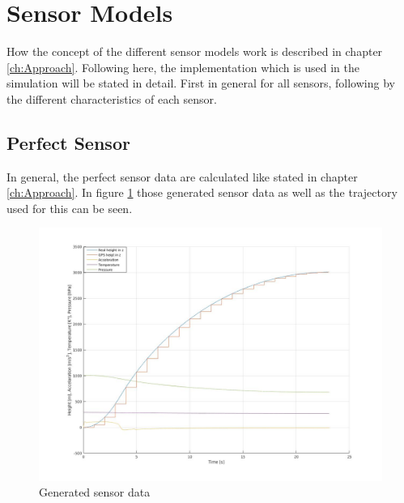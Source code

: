

\section{Sensor Models}
How the concept of the different sensor models work is described in chapter \ref{ch:Approach}.
Following here, the implementation which is used in the simulation will be stated in detail.
First in general for all sensors, following by the different characteristics of each sensor.

\subsection{Perfect Sensor}
In general, the perfect sensor data are calculated like stated in chapter \ref{ch:Approach}.
In figure \ref{fig:GeneratedPerfectSensor} those generated sensor data as well as the trajectory used for this can be seen.

\begin{figure}
 \centering
 \includegraphics[width=\textwidth]{./Pictures/GeneratedSensorData.jpg}
 \caption{Generated sensor data}
 \label{fig:GeneratedPerfectSensor}
\end{figure}

